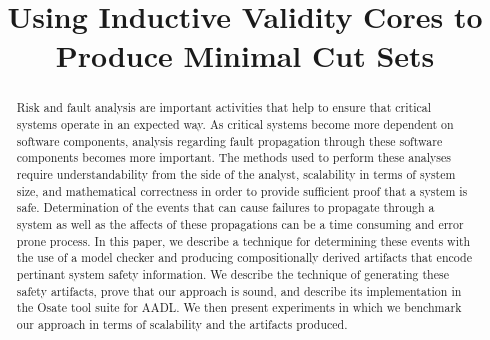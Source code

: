 \documentclass[10pt,conference]{IEEEtran}
\begin{document}
\newcommand{\stateequiv}{\equiv_{s}}
\newcommand{\traceequiv}{\equiv_{\sigma}}
\newcommand{\ta}{\text{TA}}
\newcommand{\cta}{\text{TA$_{C}$}}
\newcommand{\tta}{\text{TA$_{T}$}}
\newcommand{\ucalg}{\texttt{\small{IVC\_UC}}}
\newcommand{\ucbfalg}{\texttt{\small{IVC\_UCBF}}}
\newcommand\doesnotentail{\mkern-2mu\not\mkern2mu\vdash}


\title{Using Inductive Validity Cores to Produce Minimal Cut Sets}
%


\author{
}


\maketitle

\begin{abstract}
Risk and fault analysis are important activities that help to ensure that critical systems operate in an expected way. As critical systems become more dependent on software components, analysis regarding fault propagation through these software components becomes more important. The methods used to perform these analyses require understandability from the side of the analyst, scalability in terms of system size, and mathematical correctness in order to provide sufficient proof that a system is safe. Determination of the events that can cause failures to propagate through a system as well as the affects of these propagations can be a time consuming and error prone process. In this paper, we describe a technique for determining these events with the use of a model checker and producing compositionally derived artifacts that encode pertinant system safety information. We describe the technique of generating these safety artifacts, prove that our approach is sound, and describe its implementation in the Osate tool suite for AADL. We then present experiments in which we benchmark our approach in terms of scalability and the artifacts produced.
\end{abstract}
\end{document}
